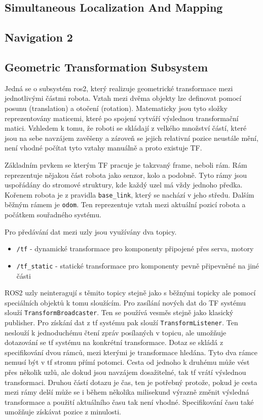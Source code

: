 \subsection{Simultaneous Localization And Mapping}



\subsection{Navigation 2}

\subsection{Geometric Transformation Subsystem}
Jedná se o subsystém ros2, který realizuje geometrické transformace mezi jednotlivými částmi robota.
Vztah mezi dvěma objekty lze definovat pomocí posunu (translation) a otočení (rotation). Matematicky jsou tyto složky reprezentovány maticemi, které po spojení vytváří výslednou transformační matici. Vzhledem k tomu, že roboti se skládají z velkého množství částí, které jsou na sebe navzájem zavěšeny a zároveň se jejich relativní pozice neustále mění, není vhodné počítat tyto vztahy manuálně a proto existuje TF.

Základním prvkem se kterým TF pracuje je takzvaný frame, neboli rám. Rám reprezentuje nějakou část robota jako senzor, kolo a podobně. Tyto rámy jsou uspořádány do stromové struktury, kde každý uzel má vždy jednoho předka. Kořenem robota je z pravidla \verb|base_link|, který se nachází v jeho středu. Dalším běžným rámem je \verb|odom|. Ten reprezentuje vztah mezi aktuální pozicí robota a počátkem souřadného systému.

Pro předávání dat mezi uzly jsou využívány dva topicy.
\begin{itemize}
	\item {\verb|/tf| - dynamické transformace pro komponenty připojené přes serva, motory}
	\item {\verb|/tf_static| - statické transformace pro komponenty pevně připevněné na jiné části}
\end{itemize} 
ROS2 uzly neinteragují s těmito topicy stejně jako s běžnými topicky ale pomocí speciálních objektů k tomu sloužícím. Pro zasílání nových dat do TF systému slouží \verb|TransformBroadcaster|. Ten se používá vesměs stejně jako klasický publisher.
Pro získání dat z tf systému pak slouží \verb|TransformListener|. Ten neslouží k jednoduchému čtení zpráv posílaných v topicu, ale umožňuje dotazování se tf systému na konkrétní transformace. Dotaz se skládá z specifikování dvou rámců, mezi kterými je transformace hledána. Tyto dva rámce nemusí být v tf stromu přímí potomci. Cesta od jednoho k druhému může vést přes několik uzlů, ale dokud jsou navzájem dosažitelné, tak tf vrátí výslednou transformaci. Druhou částí dotazu je čas, ten je potřebný protože, pokud je cesta mezi rámy delší může se i během několika milisekund výrazně změnit výsledná transformace a použití aktuálního času tak není vhodné. Specifikování času také umožňuje získávat pozice z minulosti. 

